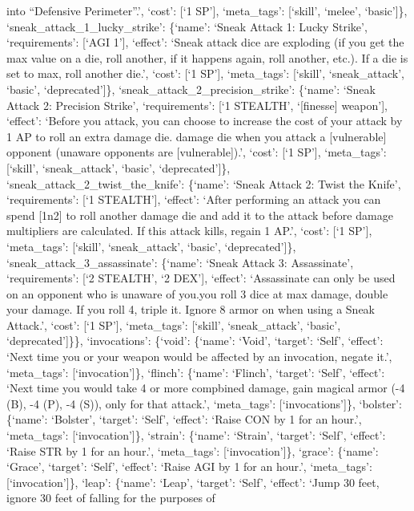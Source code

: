 \documentclass[
  letterpaper,
  DIV=11,
  numbers=noendperiod]{scrartcl}
\begin{document}
into ``Defensive Perimeter''.', `cost': {[}`1 SP'{]}, `meta\_tags':
{[}`skill', `melee', `basic'{]}\}, `sneak\_attack\_1\_lucky\_strike':
\{`name': `Sneak Attack 1: Lucky Strike', `requirements': {[}`AGI 1'{]},
`effect': `Sneak attack dice are exploding (if you get the max value on
a die, roll another, if it happens again, roll another, etc.). If a die
is set to max, roll another die.', `cost': {[}`1 SP'{]}, `meta\_tags':
{[}`skill', `sneak\_attack', `basic', `deprecated'{]}\},
`sneak\_attack\_2\_precision\_strike': \{`name': `Sneak Attack 2:
Precision Strike', `requirements': {[}`1 STEALTH', `{[}finesse{]}
weapon'{]}, `effect': `Before you attack, you can choose to increase the
cost of your attack by 1 AP to roll an extra damage die.\n{} damage
die when you attack a {[}vulnerable{]} opponent (unaware opponents are
{[}vulnerable{]}).', `cost': {[}`1 SP'{]}, `meta\_tags': {[}`skill',
`sneak\_attack', `basic', `deprecated'{]}\},
`sneak\_attack\_2\_twist\_the\_knife': \{`name': `Sneak Attack 2: Twist
the Knife', `requirements': {[}`1 STEALTH'{]}, `effect': `After
performing an attack you can spend {[}1n2{]} to roll another damage die
and add it to the attack before damage multipliers are calculated. If
this attack kills, regain 1 AP.', `cost': {[}`1 SP'{]}, `meta\_tags':
{[}`skill', `sneak\_attack', `basic', `deprecated'{]}\},
`sneak\_attack\_3\_assassinate': \{`name': `Sneak Attack 3:
Assassinate', `requirements': {[}`2 STEALTH', `2 DEX'{]}, `effect':
`Assassinate can only be used on an opponent who is unaware of
you.\n\nIf you roll 3 dice at max damage, double your damage. If you
roll 4, triple it. Ignore 8 armor on when using a Sneak Attack.',
`cost': {[}`1 SP'{]}, `meta\_tags': {[}`skill', `sneak\_attack',
`basic', `deprecated'{]}\}\}, `invocations': \{`void': \{`name': `Void',
`target': `Self', `effect': `Next time you or your weapon would be
affected by an invocation, negate it.', `meta\_tags':
{[}`invocation'{]}\}, `flinch': \{`name': `Flinch', `target': `Self',
`effect': `Next time you would take 4 or more compbined damage, gain
magical armor (-4 (B), -4 (P), -4 (S)), only for that attack.',
`meta\_tags': {[}`invocations'{]}\}, `bolster': \{`name': `Bolster',
`target': `Self', `effect': `Raise CON by 1 for an hour.', `meta\_tags':
{[}`invocation'{]}\}, `strain': \{`name': `Strain', `target': `Self',
`effect': `Raise STR by 1 for an hour.', `meta\_tags':
{[}`invocation'{]}\}, `grace': \{`name': `Grace', `target': `Self',
`effect': `Raise AGI by 1 for an hour.', `meta\_tags':
{[}`invocation'{]}\}, `leap': \{`name': `Leap', `target': `Self',
`effect': `Jump 30 feet, ignore 30 feet of falling for the purposes of
\end{document}
